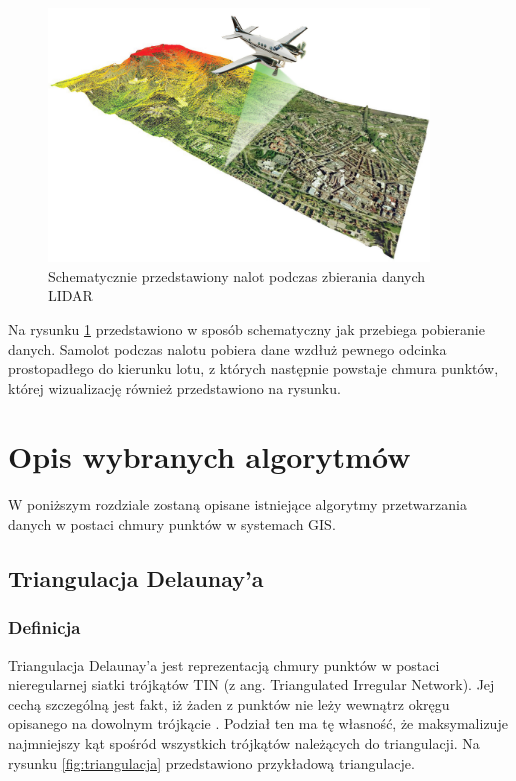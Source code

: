 \begin{figure}[h!]
\centering
\includegraphics[width=0.9\textwidth]{img/LIDAR.jpg}
\caption{Schematycznie przedstawiony nalot podczas zbierania danych LIDAR}
\label{fig:lidar}
\end{figure}

Na rysunku \ref{fig:lidar} przedstawiono w sposób schematyczny jak przebiega pobieranie danych. Samolot podczas nalotu pobiera dane wzdłuż pewnego odcinka prostopadłego do kierunku lotu, z których następnie powstaje chmura punktów, której wizualizację również przedstawiono na rysunku.

\section{Opis wybranych algorytmów}

W poniższym rozdziale zostaną opisane istniejące algorytmy przetwarzania danych w postaci chmury punktów w systemach GIS.

\subsection{Triangulacja Delaunay'a}

\subsubsection{Definicja}
Triangulacja Delaunay'a jest reprezentacją chmury punktów w postaci nieregularnej siatki trójkątów TIN (z ang. Triangulated Irregular Network).
Jej cechą szczególną jest fakt, iż żaden z punktów nie leży wewnątrz okręgu opisanego na dowolnym trójkącie \cite{Lee1980}. Podział ten ma tę własność, że maksymalizuje najmniejszy kąt spośród 
wszystkich trójkątów należących do triangulacji. Na rysunku \ref{fig:triangulacja} przedstawiono przykładową triangulacje.

